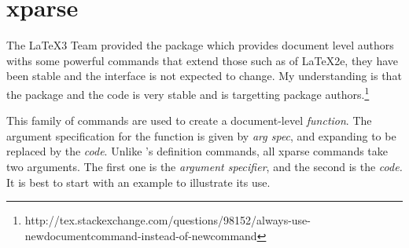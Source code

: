 \section{xparse}

The LaTeX3 Team provided the package  which provides document level 
authors withs some powerful commands that extend those such as 
of LaTeX2e, they have been stable and the interface is not expected to change. My
understanding is that the package and the code is very stable and is targetting
package authors.\footnote{http://tex.stackexchange.com/questions/98152/always-use-newdocumentcommand-instead-of-newcommand}


\DescribeMacro{\DeclareDocumentCommand}

This family of commands are used to create a document-level \textit{function}. The argument
specification for the function is given by \textit{arg spec}, and expanding to be replaced by the
\textit{code}. Unlike \latex's definition commands, all xparse commands take two arguments.
The first one is the \textit{argument specifier}, and the second is the \textit{code.} It is best to 
start with an example to illustrate its use.


